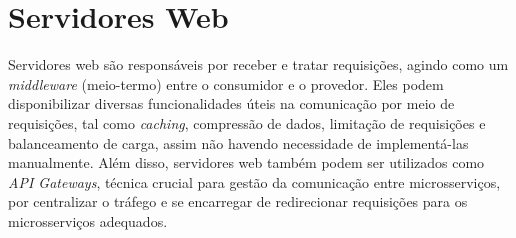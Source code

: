 




\section{Servidores Web}
Servidores web são responsáveis por receber e tratar requisições, agindo como um \emph{middleware} (meio-termo) entre o consumidor e o provedor. Eles podem disponibilizar diversas funcionalidades úteis na comunicação por meio de requisições, tal como \emph{caching}, compressão de dados, limitação de requisições e balanceamento de carga, assim não havendo necessidade de implementá-las manualmente. Além disso, servidores web também podem ser utilizados como \emph{API Gateways}, técnica crucial para gestão da comunicação entre microsserviços, por centralizar o tráfego e se encarregar de redirecionar requisições para os microsserviços adequados. 

